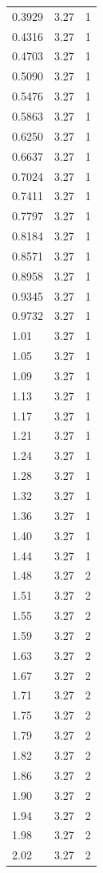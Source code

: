 \begin{longtable}{lrr}
  0.3929 & 3.27 & 1 \\
  0.4316 & 3.27 & 1 \\
  0.4703 & 3.27 & 1 \\
  0.5090 & 3.27 & 1 \\
  0.5476 & 3.27 & 1 \\
  0.5863 & 3.27 & 1 \\
  0.6250 & 3.27 & 1 \\
  0.6637 & 3.27 & 1 \\
  0.7024 & 3.27 & 1 \\
  0.7411 & 3.27 & 1 \\
  0.7797 & 3.27 & 1 \\
  0.8184 & 3.27 & 1 \\
  0.8571 & 3.27 & 1 \\
  0.8958 & 3.27 & 1 \\
  0.9345 & 3.27 & 1 \\
  0.9732 & 3.27 & 1 \\
  1.01 & 3.27 & 1 \\
  1.05 & 3.27 & 1 \\
  1.09 & 3.27 & 1 \\
  1.13 & 3.27 & 1 \\
  1.17 & 3.27 & 1 \\
  1.21 & 3.27 & 1 \\
  1.24 & 3.27 & 1 \\
  1.28 & 3.27 & 1 \\
  1.32 & 3.27 & 1 \\
  1.36 & 3.27 & 1 \\
  1.40 & 3.27 & 1 \\
  1.44 & 3.27 & 1 \\
  1.48 & 3.27 & 2 \\
  1.51 & 3.27 & 2 \\
  1.55 & 3.27 & 2 \\
  1.59 & 3.27 & 2 \\
  1.63 & 3.27 & 2 \\
  1.67 & 3.27 & 2 \\
  1.71 & 3.27 & 2 \\
  1.75 & 3.27 & 2 \\
  1.79 & 3.27 & 2 \\
  1.82 & 3.27 & 2 \\
  1.86 & 3.27 & 2 \\
  1.90 & 3.27 & 2 \\
  1.94 & 3.27 & 2 \\
  1.98 & 3.27 & 2 \\
  2.02 & 3.27 & 2 \\

\end{longtable}

